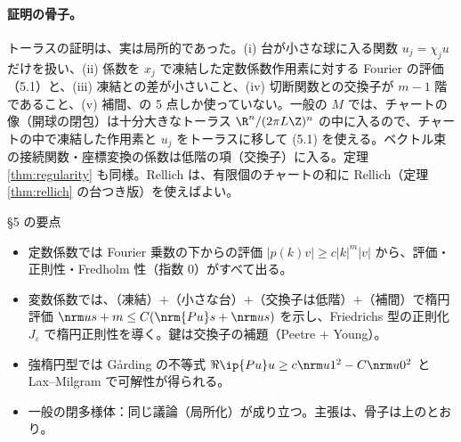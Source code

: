 \paragraph{証明の骨子。}トーラスの証明は、実は局所的であった。(i) 台が小さな球に入る関数 $u_j=\chi_ju$ だけを扱い、(ii) 係数を $x_j$ で凍結した定数係数作用素に対する Fourier の評価（5.1）と、(iii) 凍結との差が小さいこと、(iv) 切断関数との交換子が $m-1$ 階であること、(v) 補間、の 5 点しか使っていない。一般の $M$ では、チャートの像（開球の閉包）は十分大きなトーラス $\R^n/(2\pi L\Z)^n$ の中に入るので、チャートの中で凍結した作用素と $u_j$ をトーラスに移して (5.1) を使える。ベクトル束の接続関数・座標変換の係数は低階の項（交換子）に入る。定理 \ref{thm:regularity} も同様。Rellich は、有限個のチャートの和に Rellich（定理 \ref{thm:rellich} の台つき版）を使えばよい。
\begin{keybox}{§5 の要点}
\begin{itemize}
\item 定数係数では Fourier 乗数の下からの評価 $|p(k)v|\ge c|k|^m|v|$ から、評価・正則性・Fredholm 性（指数 $0$）がすべて出る。
\item 変数係数では、（凍結）$+$（小さな台）$+$（交換子は低階）$+$（補間）で楕円評価 $\nrm u{s+m}\le C(\nrm{Pu}s+\nrm us)$ を示し、Friedrichs 型の正則化 $J_\varepsilon$ で楕円正則性を導く。鍵は交換子の補題（Peetre $+$ Young）。
\item 強楕円型では Gårding の不等式 $\Re\ip{Pu}u\ge c\nrm u1^2-C\nrm u0^2$ と Lax--Milgram で可解性が得られる。
\item 一般の閉多様体：同じ議論（局所化）が成り立つ。主張は\tC、骨子は上のとおり。
\end{itemize}
\end{keybox}

